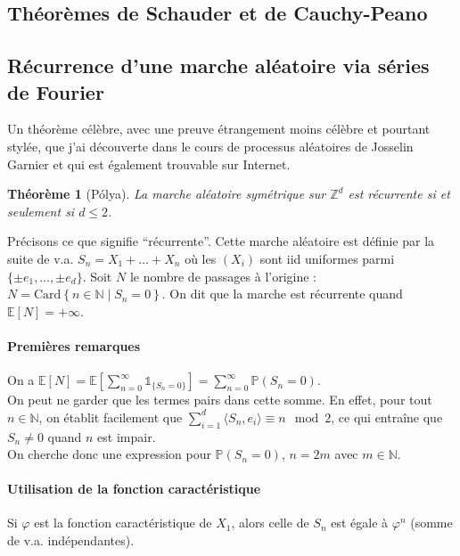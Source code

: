 \documentclass[a4paper, 11pt]{article}
\def\Z{\mathbb{Z}}
\def\N{\mathbb{N}}
\def\P{\mathbb{P}}
\def\E{\mathbb{E}}
\def\Indic{\mathbb{1}}
\newtheorem*{theorem}{Théorème}
\begin{document}
\newpage

\subsection{Théorèmes de Schauder et de Cauchy-Peano}



\subsection{Récurrence d'une marche aléatoire via séries de Fourier}

Un théorème célèbre, avec une preuve étrangement moins célèbre et pourtant
stylée, que j'ai découverte dans le cours de processus aléatoires de Josselin
Garnier et qui est également trouvable sur Internet.

\begin{theorem}[Pólya]
  La marche aléatoire symétrique sur $\Z^d$ est \emph{récurrente} si et
  seulement si $d \leq 2$.
\end{theorem}

Précisons ce que signifie \enquote{récurrente}. Cette marche aléatoire est
définie par la suite de v.a. $S_n = X_1 + \ldots + X_n$ où les $(X_i)$ sont iid
uniformes parmi $\{\pm e_1, \ldots, \pm e_d\}$. Soit $N$ le nombre de passages à
l'origine : $N = \mathrm{Card}\left\{n \in \N \mid S_n = 0\right\}$. On dit que
la marche est récurrente quand $\E[N] = +\infty$.


\paragraph{Premières remarques} On a $\displaystyle \E[N] = \E\left[
  \sum_{n=0}^\infty \Indic_{\{S_n = 0\}} \right] =
\sum_{n=0}^\infty \P(S_n = 0)$.\\
On peut ne garder que les termes pairs dans cette somme. En effet, pour tout $n
\in \N$, on établit facilement que $\sum_{i=1}^d \langle S_n, e_i \rangle \equiv
n \mod 2$, ce qui entraîne que $S_n \neq 0$ quand $n$ est impair.\\
On cherche donc une expression pour $\P(S_n = 0)$, $n = 2m$ avec $m \in \N$.

\paragraph{Utilisation de la fonction caractéristique}

Si $\varphi$ est la fonction caractéristique de $X_1$, alors celle de $S_n$
est égale à $\varphi^n$ (somme de v.a. indépendantes).
\end{document}
